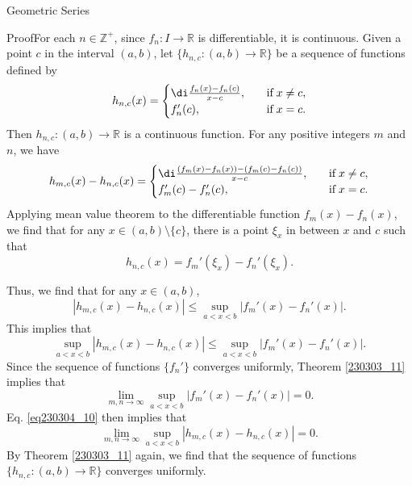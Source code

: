 \begin{example}[label=230305_16]{Geometric Series}
\begin{example}[label=230304_9]{}
\begin{myproof}{Proof}For each $n\in\mathbb{Z}^+$,  since $f_n:I\to\mathbb{R}$ is   differentiable, it is continuous.
Given a point $c$ in the interval $(a,b)$, let $\{h_{n,c}:(a,b)\to\mathbb{R}\}$ be a sequence of functions defined by
\begin{equation}\label{eq230304_13}h_{n,c}(x)=\begin{cases} \di\frac{f_n(x)-f_n(c)}{x-c},\quad &\text{if}\;x\neq c,\\f_n'(c),\quad &\text{if}\;x=c.\end{cases}\end{equation}\bp
Then $h_{n,c}:(a,b)\to\mathbb{R}$ is a continuous function. 
For any positive integers $m$ and $n$, we have
\[h_{m,c}(x)-h_{n,c}(x)=\begin{cases} \di\frac{(f_m(x)-f_n(x))-(f_m(c)-f_n(c))}{x-c},\quad &\text{if}\;x\neq c,\\f_m'(c)-f_n'(c),\quad &\text{if}\;x=c.\end{cases}\]
Applying  mean value theorem to the differentiable function $f_m(x)-f_n(x)$, we find that  for any $x\in (a,b)\setminus\{c\}$, there is a point $\xi_x$ in between $x$ and $c$ such that
\[h_{n,c}(x)= f_{m}'(\xi_x)-f_n'(\xi_{x}).\]

Thus, we find that for any $x\in (a,b)$,
\[|h_{m,c}(x)-h_{n,c}(x)|\leq \sup_{a<x<b}|f_m'(x)-f_n'(x)|.\]
This implies that
\begin{equation}\label{eq230304_10}\sup_{a<x<b}|h_{m,c}(x)-h_{n,c}(x)|\leq \sup_{a<x<b}|f_m'(x)-f_n'(x)|.\end{equation}
Since the sequence of functions $\{f_n'\}$ converges uniformly, Theorem \ref{230303_11} implies that
\[\lim_{m,n\to\infty} \sup_{a<x<b}|f_m'(x)-f_n'(x)|=0.\]
Eq. \eqref{eq230304_10} then implies that 
\[\lim_{m,n\to\infty} \sup_{a<x<b}|h_{m,c}(x)-h_{n,c}(x)|=0.\]
By Theorem  \ref{230303_11} again, we find that the sequence of functions $\{h_{n,c}:(a,b)\to\mathbb{R}\}$ converges uniformly.


\end{myproof}
\end{example}
\end{example}
